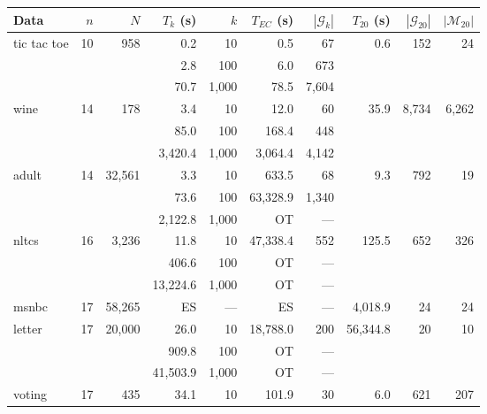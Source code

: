 \documentclass[letterpaper]{article}
\newcommand{\graphset}{\mathcal{G}}
\begin{document}
\begin{table}[!ht]
\centering
\small
\begin{tabular}{lrr||rr||rr||rrr}
Data & $n$ & $N$ & $T_k$ (s) & $k$ & $T_{EC}$ (s) & $|\graphset_k|$ & $T_{20}$ (s) & $|\graphset_{20}|$ & $|\mathcal{M}_{20}|$\\
\hline
\multirow{3}{*}{ tic tac toe } & \multirow{3}{*}{ 10 } & \multirow{3}{*}{ 958 } & 0.2 & 10 & 0.5 & 67 & \multirow{3}{*}{ 0.6 } & \multirow{3}{*}{ 152 } & \multirow{3}{*}{ 24 } \\
& & & 2.8 & 100 & 6.0 & 673 & & & \\
& & & 70.7 & 1,000 & 78.5 & 7,604 & & & \\\hline
\multirow{3}{*}{ wine } & \multirow{3}{*}{ 14 } & \multirow{3}{*}{ 178 } & 3.4 & 10 & 12.0 & 60 & \multirow{3}{*}{ 35.9 } & \multirow{3}{*}{ 8,734 } & \multirow{3}{*}{ 6,262 } \\
& & & 85.0 & 100 & 168.4 & 448 & & & \\
& & & 3,420.4 & 1,000 & 3,064.4 & 4,142 & & & \\\hline
\multirow{3}{*}{ adult } & \multirow{3}{*}{ 14 } & \multirow{3}{*}{ 32,561 } & 3.3 & 10 & 633.5 & 68 & \multirow{3}{*}{ 9.3 } & \multirow{3}{*}{ 792 } & \multirow{3}{*}{ 19 } \\
& & & 73.6 & 100 & 63,328.9 & 1,340 & & & \\
& & & 2,122.8 & 1,000 & \cellcolor{yellow}OT & --- & & & \\\hline
\multirow{3}{*}{ nltcs } & \multirow{3}{*}{ 16 } & \multirow{3}{*}{ 3,236 } & 11.8 & 10 & 47,338.4 & 552 & \multirow{3}{*}{ 125.5 } & \multirow{3}{*}{ 652 } & \multirow{3}{*}{ 326 } \\
& & & 406.6 & 100 & \cellcolor{yellow}OT & --- & & & \\
& & & 13,224.6 & 1,000 & \cellcolor{yellow}OT & --- & & & \\\hline
msnbc & 17 & 58,265 & \cellcolor{yellow}ES & --- & \cellcolor{yellow}ES & --- & 4,018.9 & 24 & 24 \\\hline
\multirow{3}{*}{ letter } & \multirow{3}{*}{ 17 } & \multirow{3}{*}{ 20,000 } & 26.0 & 10 & 18,788.0 & 200 & \multirow{3}{*}{ 56,344.8 } & \multirow{3}{*}{ 20 } & \multirow{3}{*}{ 10 } \\
& & & 909.8 & 100 & \cellcolor{yellow}OT & --- & & & \\
& & & 41,503.9 & 1,000 & \cellcolor{yellow}OT & --- & & & \\\hline
\multirow{3}{*}{ voting } & \multirow{3}{*}{ 17 } & \multirow{3}{*}{ 435 } & 34.1 & 10 & 101.9 & 30 & \multirow{3}{*}{ 6.0 } & \multirow{3}{*}{ 621 } & \multirow{3}{*}{ 207 } \\

\end{tabular}
\end{table}
\end{document}
